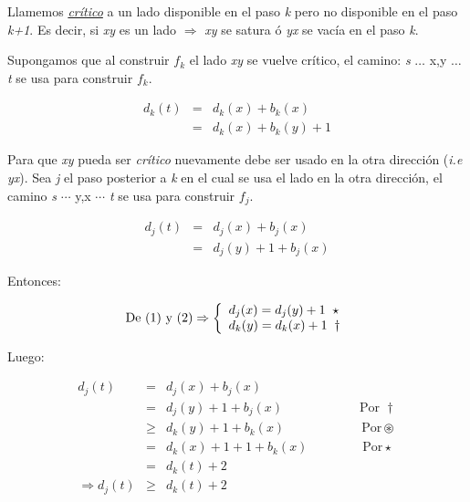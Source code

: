 \documentclass[12pt,a4paper]{report}
\begin{document}
		Llamemos \textit{\underline{crítico}} a un lado disponible en el paso \textit{k} pero no disponible en el paso \textit{k+1}. Es decir, si \textit{xy} es un lado $\Rightarrow$ \textit{xy} se satura ó \textit{yx} se vacía en el paso \textit{k}.
		
		Supongamos que al construir $f_{k}$ el lado \textit{xy} se vuelve crítico, el camino: \textit{s} $\dotsc$ x,y $\dotsc$ \textit{t} se usa para construir $f_{k}$.

		\begin{eqnarray}
			 d_{k}(\textit{t}) & = & d_{k}(x)+ b_{k}(x) \\
			\nonumber & = & d_{k}(x)+b_{k}(y)+1
		\end{eqnarray}
		
		 Para que \textit{xy} pueda ser \textit{crítico} nuevamente debe ser usado en la otra dirección (\textit{i.e yx}). Sea \textit{j} el paso posterior a \textit{k} en el cual se usa el lado en la otra dirección, el camino \textit{s} $\dotsb$ y,x $\dotsb$ \textit{t} se usa para construir $f_{j}$.
		
		\begin{eqnarray}
			d_{j}(\textit{t}) & = & d_{j}(x)+ b_{j}(x) \\
			\nonumber & = & d_{j}(y)+1+b_{j}(x)
		\end{eqnarray}
		
		Entonces:
		
		\begin{equation*}
			\textup{De (1) y (2)} \Rightarrow
  			\left \lbrace
  			\begin{array}{l}
    		 d_{j}(x) = d_{j}(y)+1 \; \; \star \\
     		 d_{k}(y) = d_{k}(x)+1 \; \; \dag\\
  			\end{array}
  			\right.
		\end{equation*}
		
		Luego:

		\begin{eqnarray}
			\nonumber d_{j}(\textit{t}) & = & d_{j}(x)+ b_{j}(x) \\
			\nonumber & = & d_{j}(y)+1+b_{j}(x) \qquad\qquad\qquad\text{Por } \dag\\
			\nonumber & \geq & d_{k}(y)+1+b_{k}(x) \qquad\qquad\qquad\text{Por} \circledast \\
			\nonumber & = & d_{k}(x)+1+1+b_{k}(x) \;\qquad\qquad\text{Por} \star \\
			\nonumber & = & d_{k}(\textit{t})+2 \\
			\nonumber \Rightarrow d_{j}(\textit{t}) & \geq & d_{k}(\textit{t})+2
		\end{eqnarray}
		
\end{document}
